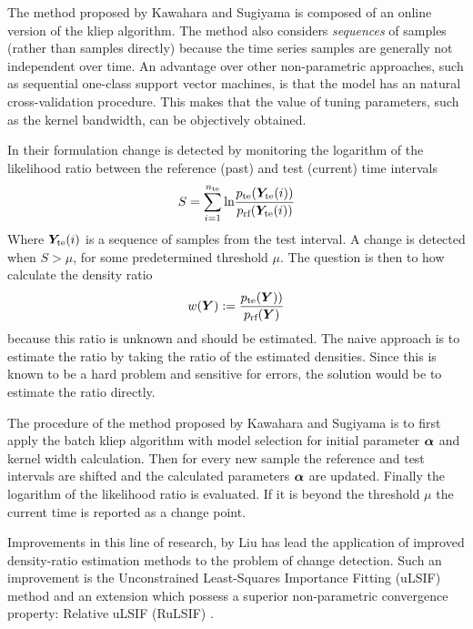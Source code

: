 The method proposed by Kawahara and Sugiyama \cite{kawahara2009change} is composed of an online version of the \gls{kliep} algorithm.
The method also considers \emph{sequences} of samples (rather than samples directly) because the time series samples are generally not independent over time.
An advantage over other non-parametric approaches, such as sequential one-class support vector machines, is that the model has an natural cross-validation procedure.
This makes that the value of tuning parameters, such as the kernel bandwidth, can be objectively obtained.

In their formulation change is detected by monitoring the logarithm of the likelihood ratio between the reference (past) and test (current) time intervals
\begin{equation}
  S = \sum_{i=1}^{n_\text{te}} \text{ln} \frac{p_{\text{te}}(\matrixsym{Y}_\text{te}(i))}{p_\text{rf}(\matrixsym{Y}_\text{te}(i))}
\end{equation}
Where $\matrixsym{Y}_\text{te}(i)$ is a sequence of samples from the test interval.
A change is detected when $S > \mu$, for some predetermined threshold $\mu$.
The question is then to how calculate the density ratio
\begin{equation}
  w(\matrixsym{Y}) := \frac{p_\text{te}(\matrixsym{Y)})}{p_\text{rf}(\matrixsym{Y})}
\end{equation}
because this ratio is unknown and should be estimated.
The naive approach is to estimate the ratio by taking the ratio of the estimated densities.
Since this is known to be a hard problem and sensitive for errors, the solution would be to estimate the ratio directly.

The procedure of the method proposed by Kawahara and Sugiyama \cite{kawahara2009change} is to first apply the batch \gls{kliep} algorithm with model selection for initial parameter $\vectorsym{\alpha}$ and kernel width calculation.
Then for every new sample the reference and test intervals are shifted and the calculated parameters $\vectorsym{\alpha}$ are updated.
Finally the logarithm of the likelihood ratio is evaluated.
If it is beyond the threshold $\mu$ the current time is reported as a change point.

Improvements in this line of research, by Liu \etal \cite{liu2013change} has lead the application of improved density-ratio estimation methods to the problem of change detection.
Such an improvement is the Unconstrained Least-Squares Importance Fitting (uLSIF) method \cite{kanamori2009least} and an extension which possess a superior non-parametric convergence property: Relative uLSIF (RuLSIF) \cite{yamada2013relative}.